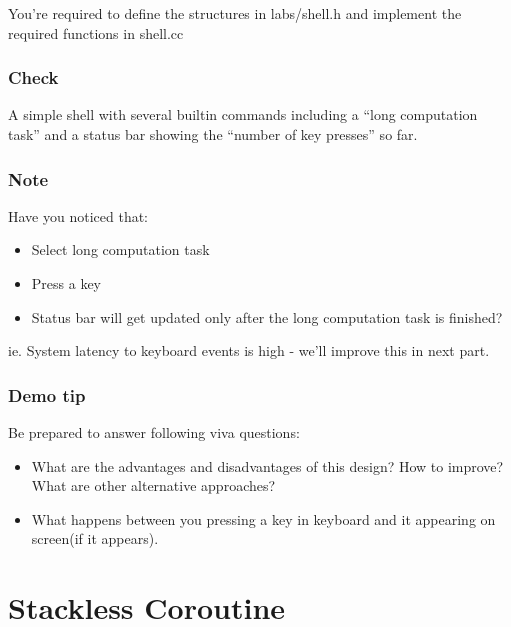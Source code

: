 \documentclass[]{book}
\begin{document}
You're required to define the structures in labs/shell.h and implement
the required functions in shell.cc

\subsubsection*{Check}\label{check-3}

A simple shell with several builtin commands including a ``long
computation task'' and a status bar showing the ``number of key
presses'' so far.

\subsubsection*{Note}\label{note-4}

Have you noticed that:

\begin{itemize}
\itemsep1pt\parskip0pt
\item
  Select long computation task
\item
  Press a key
\item
  Status bar will get updated only after the long computation task is
  finished?
\end{itemize}

ie. System latency to keyboard events is high - we'll improve this in
next part.

\subsubsection*{Demo tip}\label{demo-tip-3}

Be prepared to answer following viva questions:

\begin{itemize}
\itemsep1pt\parskip0pt
\item
  What are the advantages and disadvantages of this design? How to
  improve? What are other alternative approaches?
\item
  What happens between you pressing a key in keyboard and it appearing
  on screen(if it appears).
\end{itemize}

\section{Stackless Coroutine}\label{stackless-coroutine}
\end{document}
